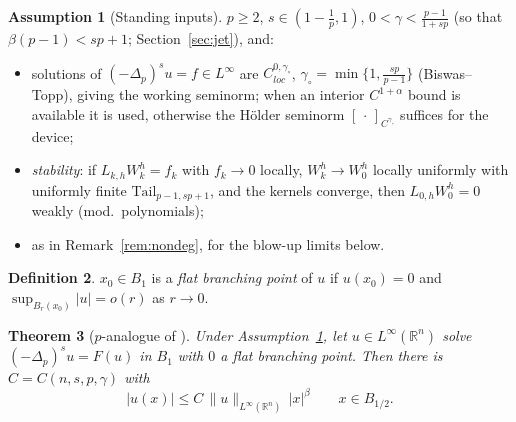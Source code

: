 \documentclass[11pt]{amsart}
\theoremstyle{plain}
\newtheorem{theorem}{Theorem}[section]
\theoremstyle{definition}
\newtheorem{definition}[theorem]{Definition}
\newtheorem{assumption}[theorem]{Assumption}
\theoremstyle{remark}
\newcommand{\R}{\mathbb{R}}
\newcommand{\fpl}[1]{(-\Delta_p)^{s}#1}
\newcommand{\al}{\alpha}
\begin{document}
\begin{assumption}[Standing inputs]\label{ass:inputs}
$p\ge2$, $s\in(1-\tfrac1p,1)$, $0<\gamma<\tfrac{p-1}{1+sp}$ (so that
$\beta(p-1)<sp+1$; Section~\ref{sec:jet}), and:
\begin{itemize}
\item[\textnormal{(R)}] solutions of $\fpl{u}=f\in L^\infty$ are
$C^{0,\gamma_\circ}_{loc}$, $\gamma_\circ=\min\{1,\frac{sp}{p-1}\}$
\textnormal{(Biswas--Topp)}, giving the working seminorm; when an interior
$C^{1+\al}$ bound is available it is used, otherwise the H\"older seminorm
$[\,\cdot\,]_{C^{\gamma_\circ}}$ suffices for the device;
\item[\textnormal{(S)}] \emph{stability}: if $L_{k,h}W_k^h=f_k$ with $f_k\to0$
locally, $W_k^h\to W_0^h$ locally uniformly with uniformly finite
$\mathrm{Tail}_{p-1,sp+1}$, and the kernels converge, then $L_{0,h}W_0^h=0$
weakly \textnormal{(}mod.\ polynomials\textnormal{)};
\item[\textnormal{(ND)},$(\star)$] as in Remark~\ref{rem:nondeg}, for the
blow-up limits below.
\end{itemize}
\end{assumption}

\begin{definition}\label{def:flat}
$x_0\in B_1$ is a \emph{flat branching point} of $u$ if $u(x_0)=0$ and
$\sup_{B_r(x_0)}|u|=o(r)$ as $r\to0$.
\end{definition}

\begin{theorem}[$p$-analogue of {\cite[Thm 4.1]{PTU}}]\label{thm:main}
Under Assumption~\ref{ass:inputs}, let $u\in L^\infty(\R^n)$ solve
$\fpl{u}=F(u)$ in $B_1$ with $0$ a flat branching point. Then there is
$C=C(n,s,p,\gamma)$ with
\[
  |u(x)|\le C\,\|u\|_{L^\infty(\R^n)}\,|x|^{\beta}\qquad x\in B_{1/2}.
\]
\end{theorem}
\end{document}
